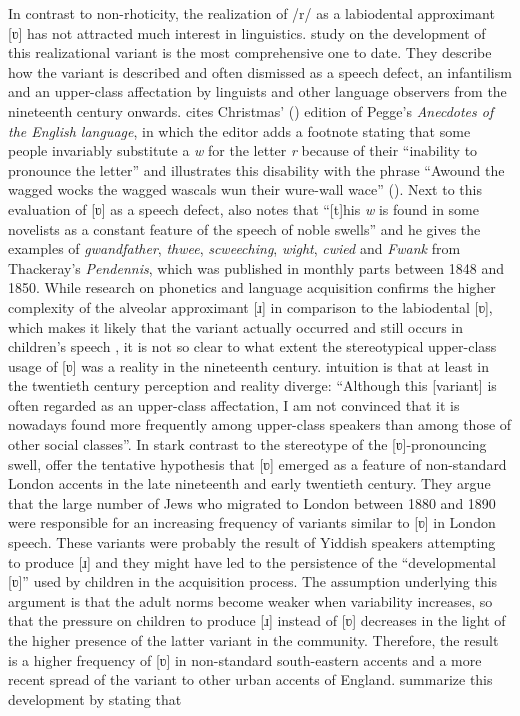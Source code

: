 In contrast to non-rhoticity, the realization of /r/ as a labiodental approximant [ʋ] has not attracted much interest in linguistics.  study on the development of this realizational variant is the most comprehensive one to date. They describe how the variant is described and often dismissed as a speech defect, an infantilism and an upper-class affectation by linguists and other language observers from the nineteenth century onwards. \citet[354--355]{Jespersen19091948} cites Christmas' (\citeyear{Pegge1844}) edition of Pegge’s \emph{Anecdotes of the English language}, in which the editor adds a footnote stating that some people invariably substitute a \emph{w} for the letter \emph{r} because of their “inability to pronounce the letter” and illustrates this disability with the phrase “Awound the wagged wocks the wagged wascals wun their wure-wall wace” (\citeyear[66]{Pegge1844}). Next to this evaluation of [ʋ] as a speech defect, \citet[355]{Jespersen19091948} also notes that “[t]his \emph{w} is found in some novelists as a constant feature of the speech of noble swells” and he gives the examples of \emph{gwandfather}, \emph{thwee}, \emph{scweeching}, \emph{wight}, \emph{cwied} and \emph{Fwank} from Thackeray’s \emph{Pendennis}, which was published in monthly parts between 1848 and 1850. While research on phonetics and language acquisition confirms the higher complexity of the alveolar approximant [ɹ] in comparison to the labiodental [ʋ], which makes it likely that the variant actually occurred and still occurs in children’s speech \citep[55]{Foulkes2000}, it is not so clear to what extent the stereotypical upper-class usage of [ʋ] was a reality in the nineteenth century.  intuition is that at least in the twentieth century perception and reality diverge: “Although this [variant] is often regarded as an upper-class affectation, I am not convinced that it is nowadays found more frequently among upper-class speakers than among those of other social classes”. In stark contrast to the stereotype of the [ʋ]-pronouncing swell, \citet{Foulkes2000} offer the tentative hypothesis that [ʋ] emerged as a feature of non-standard London accents in the late nineteenth and early twentieth century. They argue that the large number of Jews who migrated to London between 1880 and 1890 were responsible for an increasing frequency of variants similar to [ʋ] in London speech. These variants were probably the result of Yiddish speakers attempting to produce [ɹ] and they might have led to the persistence of the “developmental [ʋ]” used by children in the acquisition process. The assumption underlying this argument is that the adult norms become weaker when variability increases, so that the pressure on children to produce [ɹ] instead of [ʋ] decreases in the light of the higher presence of the latter variant in the community. Therefore, the result is a higher frequency of [ʋ] in non-standard south-eastern accents and a more recent spread of the variant to other urban accents of England. \citet[212]{Altendorf2008} summarize this development by stating that


